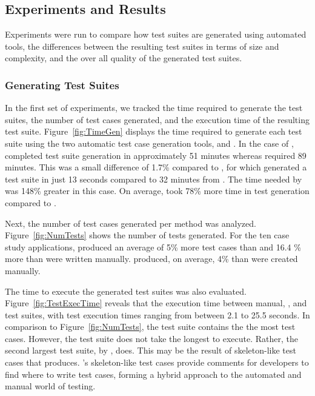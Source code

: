 \subsection{Experiments and Results}
Experiments were run to compare how test suites are generated using automated tools, the differences between the resulting test suites in terms of size and complexity, and the over all quality of the generated test suites.  

\subsubsection{Generating Test Suites }
In the first set of experiments, we tracked the time required to generate the test suites, the number of test cases generated, and the execution time of the resulting test suite.  Figure~\ref{fig:TimeGen} displays the time required to generate each test suite using the two automatic test case generation tools, \codepro and \evo.  In the case of \netweaver, \codepro completed test suite generation in approximately 51 minutes whereas \evo required 89 minutes.  This was a small difference of 1.7\% compared to \xisemele, for which \codepro generated a test suite in just 13 seconds compared to 32 minutes from \evo.  The time needed by \evo was 148\% greater in this case.  On average, \evo took 78\% more time in test generation compared to \codepro.

Next, the number of test cases generated per method was analyzed.  Figure~\ref{fig:NumTests} shows the number of tests generated.  For the ten case study applications, \codepro produced an average of  5\% more test cases than \evo and 16.4 \% more than were written manually.  \evo produced, on average, 4\% than were created manually. 

The time to execute the generated test suites was also evaluated. Figure~\ref{fig:TestExecTime} reveals that the execution time between manual, \evo, and \codepro test suites, with test execution times ranging from between 2.1 to 25.5 seconds. In comparison to Figure~\ref{fig:NumTests}, the \netweaver test suite contains the the most test cases. However, the \netweaver \codepro test suite does not take the longest to execute.  Rather, the second largest test suite, \jsecurity by \evo, does. This may be the result of skeleton-like test cases that \codepro produces. \codepro's skeleton-like test cases provide comments for developers to find where to write test cases, forming a hybrid approach to the automated and manual world of testing.%

